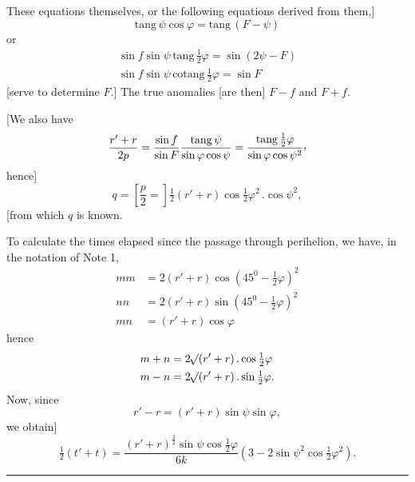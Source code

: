 These equations themselves, or the following equations derived from them,]
\[
\mathrm{tang}\,\psi\cos\varphi=\mathrm{tang}\,(F-\psi)
\]
or
\[
\begin{gathered}
\sin f\sin\psi\,\mathrm{tang}\,\tfrac12\varphi=\sin(2\psi-F)\\
\sin f\sin\psi\,\mathrm{cotang}\,\tfrac12\varphi=\sin F
\end{gathered}
\]
[serve to determine \(F\).] The true anomalies [are then] \(F-f\) and \(F+f\).

[We also have
\[
\frac{r'+r}{2p}=\frac{\sin f}{\sin F}\frac{\mathrm{tang}\,\psi}{\sin\varphi\cos\psi}=\frac{\mathrm{tang}\,\tfrac12\varphi}{\sin\varphi\cos\psi^2}\mathpunct{\raisebox{.45ex}{,}}
\]
hence]
\[
q=\left[\frac p2=\right]\tfrac12(r'+r)\cos\tfrac12\varphi^2\,.\cos\psi^2,
\]
[from which \(q\) is known.

To calculate the times elapsed since the passage through perihelion, we have, in the notation of Note 1,
\[
\begin{aligned}
mm&=2(r'+r)\cos(45^0-\tfrac12\varphi)^2\\
nn&=2(r'+r)\sin(45^0-\tfrac12\varphi)^2\\
mn&=(r'+r)\cos\varphi
\end{aligned}
\]
hence
\[
\begin{aligned}
m+n&=2\mathord{{}^{}\!\surd}(r'+r)\,.\cos\tfrac12\varphi\\
m-n&=2\mathord{{}^{}\!\surd}(r'+r)\,.\sin\tfrac12\varphi.
\end{aligned}
\]
Now, since
\[
r'-r=(r'+r)\sin\psi\sin\varphi,
\]
we obtain]
\[
\tfrac12(t'+t)=\frac{(r'+r)^{\frac32}\sin\psi\cos\tfrac12\varphi}{6k}(3-2\sin\psi^2\cos\tfrac12\varphi^2).
\]
\begin{center}\rule{.3\linewidth}{.4pt}\end{center}
